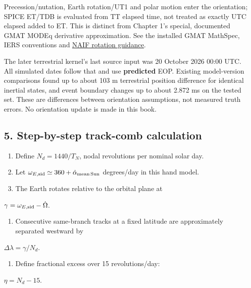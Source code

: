 \documentclass[10pt,a4paper]{article}
\numberwithin{equation}{section}
\begin{document}
\begin{sloppypar}Precession/nutation, Earth rotation/UT1 and polar motion enter the orientation; SPICE ET/TDB is evaluated from TT elapsed time, not treated as exactly UTC elapsed added to ET. This is distinct from Chapter 1's special, documented GMAT MODEq derivative approximation. See the installed GMAT MathSpec, IERS conventions and \href{https://naif.jpl.nasa.gov/pub/naif/toolkit_docs/C/req/rotation.html}{NAIF rotation guidance}.\end{sloppypar}


\begin{sloppypar}The later terrestrial kernel's last source input was 20 October 2026 00:00 UTC. All simulated dates follow that and use \textbf{predicted} EOP. Existing model-version comparisons found up to about 103 m terrestrial position difference for identical inertial states, and event boundary changes up to about 2.872 ms on the tested set. These are differences between orientation assumptions, not measured truth errors. No orientation update is made in this book.\end{sloppypar}


\subsection*{5. Step-by-step track-comb calculation}

\begin{enumerate}
\item Define \(N_d=1440/T_N\), nodal revolutions per nominal solar day.
\item Let \(\omega_{E,\rm sid}\simeq360+\dot\alpha_{\rm mean\,Sun}\) degrees/day in this hand model.
\item The Earth rotates relative to the orbital plane at
\end{enumerate}
\begin{sloppypar}   \(\gamma=\omega_{E,\rm sid}-\dot\Omega\).\end{sloppypar}

\begin{enumerate}[start=4]
\item Consecutive same-branch tracks at a fixed latitude are approximately separated westward by
\end{enumerate}
\begin{sloppypar}   \(\Delta\lambda=\gamma/N_d\).\end{sloppypar}

\begin{enumerate}[start=5]
\item Define fractional excess over 15 revolutions/day:
\end{enumerate}
\begin{sloppypar}   \(\eta=N_d-15\).\end{sloppypar}
\end{document}
